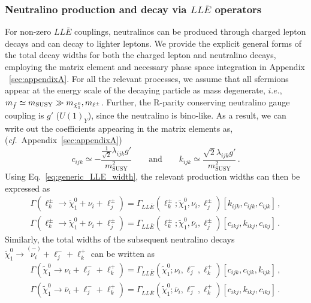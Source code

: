 \subsubsection{Neutralino production and decay via $LL\bar E$ operators}
For non-zero $LL \bar E$ couplings, neutralinos can be produced through charged lepton decays and can decay 
to lighter leptons. We provide the explicit general forms of the total decay widths for both the charged lepton and
neutralino decays, employing the matrix element and necessary phase space integration in 
Appendix ~\ref{sec:appendixA}. For all the relevant processes, we assume that all sfermions appear at the energy scale 
of the decaying particle as mass degenerate, $i.e.$, $m_{\tilde{f}} \simeq m_\text{SUSY} \gg m_{\tilde\chi_1^0}, m_{\ell^{\pm}}$. 
Further, the R-parity conserving neutralino gauge coupling is $g'$ ($U(1)_Y$), since the neutralino is bino-like.
As a result, we can write out the coefficients appearing in the matrix elements as, (\textit{cf.}~Appendix~\ref{sec:appendixA})
\begin{equation}
    \label{eq:coeff_LLE}
  c_{ijk} \simeq -\frac{\frac{1}{\sqrt{2}} \lambda_{ijk} g' }{m_\text{SUSY}^2} \qquad \text{and} \qquad k_{ijk} \simeq \frac{\sqrt{2} \lambda_{ijk} g' }{m_\text{SUSY}^2}\, .
\end{equation}
Using Eq.~\eqref{eq:generic_LLE_width}, the relevant production widths can then be expressed as
\begin{align}
    \varGamma(\ell_k^\pm \rightarrow \tilde\chi_1^0 + \nu_i + \ell_j^\pm) = \varGamma_{LL\bar E} (\ell_k^\pm; \tilde\chi_1^0, \nu_i, \ell_j^\pm)[k_{ijk},c_{ijk},c_{ijk}] \, , \\
    \varGamma(\ell_k^\pm \rightarrow \tilde\chi_1^0 + \bar\nu_i + \ell_j^\pm) = \varGamma_{LL\bar E} (\ell_k^\pm; \tilde\chi_1^0, \bar\nu_i, \ell_j^\pm)[c_{ikj},k_{ikj},c_{ikj}] \, .
\end{align}
Similarly, the total widths of the subsequent neutralino decays $\tilde\chi_1^0 \rightarrow \overset{\scriptscriptstyle(-)}{\nu_i} + \ell_j^- + \ell_k^+$ can be written as
\begin{align}
    \varGamma(\tilde\chi_1^0 \rightarrow \nu_i + \ell_j^- + \ell_k^+) = \varGamma_{LL\bar E} (\tilde\chi_1^0; \nu_i, \ell_j^-, \ell_k^+)[c_{ijk},c_{ijk},k_{ijk}] \, , \\
    \varGamma(\tilde\chi_1^0 \rightarrow \bar\nu_i + \ell_j^- + \ell_k^+) = \varGamma_{LL\bar E} (\tilde\chi_1^0; \bar\nu_i, \ell_j^-, \ell_k^+)[c_{ikj},k_{ikj},c_{ikj}] \, .
\end{align}




